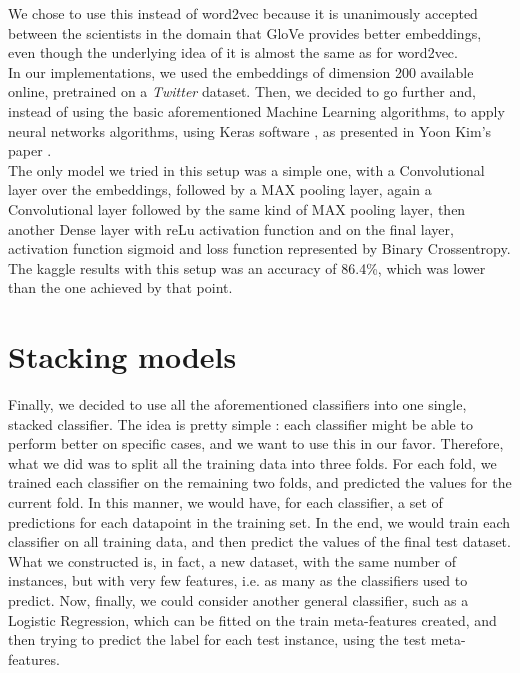 \documentclass[10pt,conference,compsocconf]{IEEEtran}
\begin{document}
We chose to use this instead of word2vec because it is unanimously accepted between the scientists in the domain that GloVe provides better embeddings, even though the underlying idea of it is almost the same as for word2vec.  \\

In our implementations, we used the embeddings of dimension 200 available online, pretrained on a \textit{Twitter} dataset. Then, we decided to go further and,  instead of using the basic aforementioned Machine Learning algorithms, to apply neural networks algorithms, using Keras software \cite{Cho15}, as presented in Yoon Kim's paper \cite{Kim14}. \\

The only model we tried in this setup was a simple one, with a Convolutional layer over the embeddings, followed by a MAX pooling layer, again a Convolutional layer followed by the same kind of MAX pooling layer, then another Dense layer with reLu activation function and on the final layer, activation function sigmoid and loss function represented by Binary Crossentropy. The kaggle results with this setup was an accuracy of 86.4\%, which was lower than the one achieved by that point.

\section{Stacking models}
Finally, we decided to use all the aforementioned classifiers into one single, stacked classifier. The idea is pretty simple \cite{Bre96}: each classifier might be able to perform better on specific cases, and we want to use this in our favor. Therefore, what we did was to split all the training data into three folds. For each fold, we trained each classifier on the remaining two folds, and predicted the values for the current fold. In this manner, we would have, for each classifier, a set of predictions for each datapoint in the training set. In the end, we would train each classifier on all training data, and then predict the values of the final test dataset. \\

What we constructed is, in fact, a new dataset, with the same number of instances, but with very few features, i.e. as many as the classifiers used to predict. Now, finally, we could consider another general classifier, such as a Logistic Regression, which can be fitted on the train meta-features created, and then trying to predict the label for each test instance, using the test meta-features. \\
\end{document}
